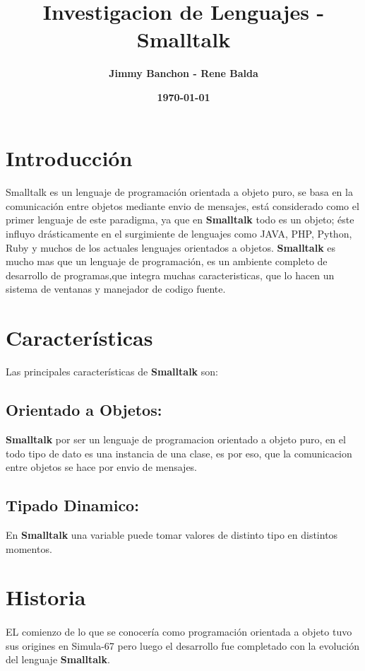\documentclass[11pt]{article}
\title{\textbf{Investigacion de Lenguajes - Smalltalk}}
\author{\textbf{Jimmy Banchon - Rene Balda}}
\date{\textbf{\today}}
\begin{document}
\maketitle
\section{\textbf{Introducción}} 
\paragraph{} \noindent
Smalltalk es un lenguaje de programación orientada a objeto puro, se basa en la comunicación entre objetos mediante envio de mensajes, está considerado como el primer lenguaje de este paradigma, ya que  en \textbf{Smalltalk} todo es un objeto; éste influyo drásticamente en el surgimiente de lenguajes como JAVA, PHP, Python, Ruby y muchos de los actuales lenguajes orientados a objetos.
 \textbf{Smalltalk} es mucho mas que un lenguaje de programación, es un ambiente completo de desarrollo de programas,que integra muchas caracteristicas, que lo hacen un sistema de ventanas y manejador de codigo fuente.
\section{\textbf{Características}}
Las principales características de  \textbf{Smalltalk} son:
\subsection{\textbf{Orientado a Objetos:}}
\textbf{Smalltalk} por ser un lenguaje de programacion orientado a objeto puro, en el todo tipo de dato es una instancia de una clase, es por eso, que la comunicacion entre objetos se hace por envio de mensajes.
\subsection{\textbf{Tipado Dinamico:}}
En \textbf{Smalltalk} una variable puede tomar valores de distinto tipo en distintos momentos. 

\section{Historia}
\paragraph{} \noindent
EL comienzo de lo que se conocería como programación orientada a objeto tuvo sus origines en Simula-67 pero luego el desarrollo fue completado con la evolución del lenguaje \textbf{Smalltalk}.
\end{document}
